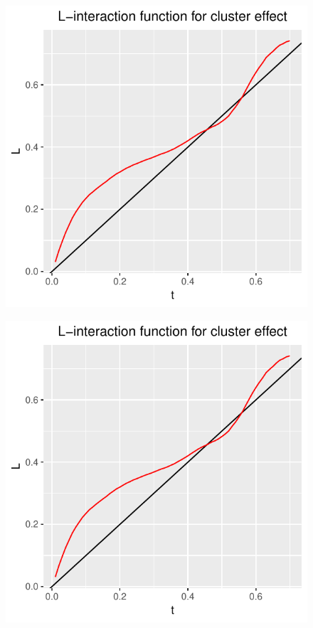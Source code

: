 \begin{figure}
    \centering
    \includegraphics[scale=0.95]{figures/L_cluster_plot.pdf}
    \caption{}
    \label{fig:cluster_L_function}
\end{figure}
\begin{figure}
    \centering
    \includegraphics[scale=0.95]{figures/L_cluster_plot.pdf}
    \caption{}
    \label{fig:cluster_L_function}
\end{figure}